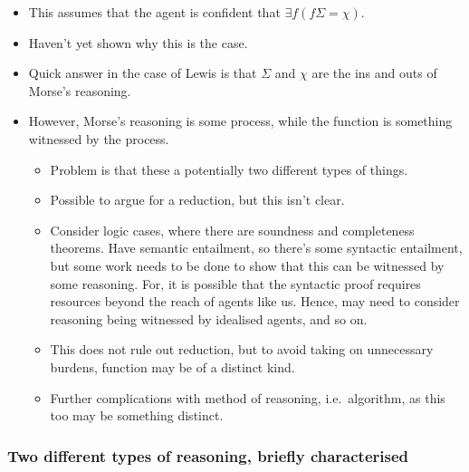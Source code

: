 \documentclass[10pt]{article}
\newcommand{\hozlinedash}[0]{%
  \noindent\hdashrule[0.5ex][c]{\textwidth}{.1pt}{2.5pt}
}
\begin{document}
\hozlinedash

\begin{itemize}
\item This assumes that the agent is confident that \(\exists f(f\Sigma = \chi)\).
\item Haven't yet shown why this is the case.
\item Quick answer in the case of Lewis is that \(\Sigma\) and \(\chi\) are the ins and outs of Morse's reasoning.
\item However, Morse's reasoning is some process, while the function is something witnessed by the process.
  \begin{itemize}
  \item Problem is that these a potentially two different types of things.
  \item Possible to argue for a reduction, but this isn't clear.
  \item Consider logic cases, where there are soundness and completeness theorems.
    Have semantic entailment, so there's some syntactic entailment, but some work needs to be done to show that this can be witnessed by some reasoning.
    For, it is possible that the syntactic proof requires resources beyond the reach of agents like us.
    Hence, may need to consider reasoning being witnessed by idealised agents, and so on.
  \item This does not rule out reduction, but to avoid taking on unnecessary burdens, function may be of a distinct kind.
  \item Further complications with method of reasoning, i.e.\ algorithm, as this too may be something distinct.
  \end{itemize}
\end{itemize}

\subsubsection{Two different types of reasoning, briefly characterised}
\label{sec:two-different-types}
\end{document}
